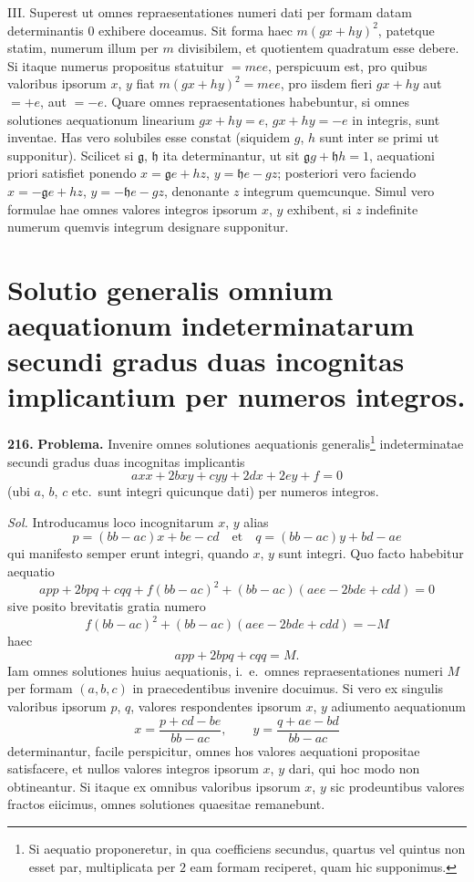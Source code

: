 \documentclass[12pt,a4paper]{article}
\theoremstyle{plain}
\theoremstyle{definition}
\theoremstyle{remark}
\begin{document}
III. Superest ut omnes repraesentationes numeri dati per formam datam determinantis $0$ exhibere doceamus. Sit forma haec $m(gx+hy)^2$, patetque statim, numerum illum per $m$ divisibilem, et quotientem quadratum esse debere. Si itaque numerus propositus statuitur $=mee$, perspicuum est, pro quibus valoribus ipsorum $x$, $y$ fiat $m(gx+hy)^2=mee$, pro iisdem fieri $gx+hy$ aut $=+e$, aut $=-e$. Quare omnes repraesentationes habebuntur, si omnes solutiones aequationum linearium $gx+hy=e$, $gx+hy=-e$ in integris, sunt inventae. Has vero solubiles esse constat (siquidem $g$, $h$ sunt inter se primi ut supponitur). Scilicet si $\mathfrak{g}$, $\mathfrak{h}$ ita determinantur, ut sit $\mathfrak{g}g+\mathfrak{h}h=1$, aequationi priori satisfiet ponendo $x=\mathfrak{g}e+hz$, $y=\mathfrak{h}e-gz$; posteriori vero faciendo $x=-\mathfrak{g}e+hz$, $y=-\mathfrak{h}e-gz$, denonante $z$ integrum quemcunque. Simul vero formulae hae omnes valores integros ipsorum $x$, $y$ exhibent, si $z$ indefinite numerum quemvis integrum designare supponitur.


\section*{Solutio generalis omnium aequationum indeterminatarum secundi gradus duas incognitas implicantium per numeros integros.}

\textbf{216.}
\textbf{Problema.}
Invenire omnes solutiones aequationis generalis\footnote{Si aequatio proponeretur, in qua coefficiens secundus, quartus vel quintus non esset par, multiplicata per $2$ eam formam reciperet, quam hic supponimus.} indeterminatae secundi gradus duas incognitas implicantis
\[
axx+2bxy+cyy+2dx+2ey+f=0
\]
(ubi $a$, $b$, $c$ etc.\ sunt integri quicunque dati) per numeros integros.

\textit{Sol.}
Introducamus loco incognitarum $x$, $y$ alias
\[
p = (bb-ac)x+be-cd\quad\text{et}\quad q=(bb-ac)y+bd-ae
\]
qui manifesto semper erunt integri, quando $x$, $y$ sunt integri. Quo facto habebitur aequatio
\[
app+2bpq+cqq+f(bb-ac)^2+(bb-ac)(aee-2bde+cdd)=0
\]
sive posito brevitatis gratia numero
\[
f(bb-ac)^2+(bb-ac)(aee-2bde+cdd)=-M
\]
haec
\[
app+2bpq+cqq=M.
\]
Iam omnes solutiones huius aequationis, i.\ e.\ omnes repraesentationes numeri $M$ per formam $(a,b,c)$ in praecedentibus invenire docuimus. Si vero ex singulis valoribus ipsorum $p$, $q$, valores respondentes ipsorum $x$, $y$ adiumento aequationum
\[
x=\frac{p+cd-be}{bb-ac},\qquad y=\frac{q+ae-bd}{bb-ac}
\]
determinantur, facile perspicitur, omnes hos valores aequationi propositae satisfacere, et nullos valores integros ipsorum $x$, $y$ dari, qui hoc modo non obtineantur. Si itaque ex omnibus valoribus ipsorum $x$, $y$ sic prodeuntibus valores fractos eiicimus, omnes solutiones quaesitae remanebunt.
\end{document}
